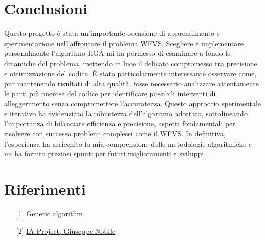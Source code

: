 \documentclass[12pt,a4paper,twoside]{article}
\begin{document}
\section{Conclusioni}
Questo progetto è stata un'importante occasione di apprendimento e sperimentazione nell'affrontare il problema WFVS. Scegliere e implementare personalmente l'algoritmo HGA mi ha permesso di esaminare a fondo le dinamiche del problema, mettendo in luce il delicato compromesso tra precisione e ottimizzazione del codice. È stato particolarmente interessante osservare come, pur mantenendo risultati di alta qualità, fosse necessario analizzare attentamente le parti più onerose del codice per identificare possibili interventi di alleggerimento senza compromettere l'accuratezza. Questo approccio sperimentale e iterativo ha evidenziato la robustezza dell'algoritmo adottato, sottolineando l'importanza di bilanciare efficienza e precisione, aspetti fondamentali per risolvere con successo problemi complessi come il WFVS. In definitiva, l'esperienza ha arricchito la mia comprensione delle metodologie algoritmiche e mi ha fornito preziosi spunti per futuri miglioramenti e sviluppi.
\section{Riferimenti}
\begin{enumerate}

    \item[{[1]}] \label{2} \href{https://en.wikipedia.org/wiki/Genetic_algorithm}{Genetic algorithm}
    \item[{[2]}] \label{3} \href{https://github.com/Peppe-dmi/AI-project.git}{IA-Project, Giuseppe Nobile}
\end{enumerate}
\printindex
\end{document}
